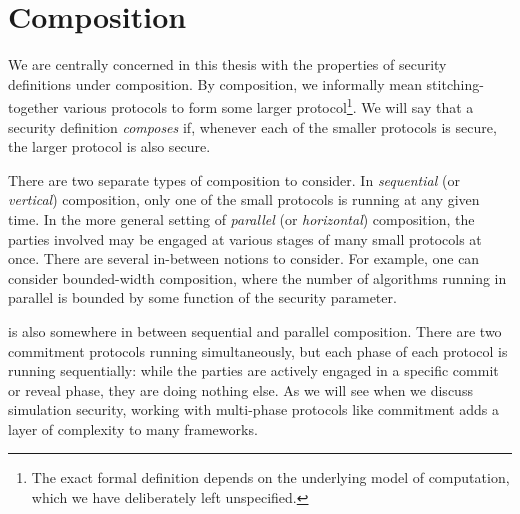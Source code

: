 

\section{Composition}

We are centrally concerned in this thesis with the properties of security
definitions under composition. By composition, we informally mean
stitching-together various protocols to form some larger protocol\footnote{The
	exact formal definition depends on the underlying model of computation, which
	we have deliberately left unspecified.}. We will say that a security
definition \emph{composes} if, whenever each of the smaller protocols is
secure, the larger protocol is also secure.

There are two separate types of composition to consider. In \emph{sequential}
(or \emph{vertical}) composition, only one of the small protocols is running at
any given time. In the more general setting of \emph{parallel} (or
\emph{horizontal}) composition, the parties involved may be engaged at various
stages of many small protocols at once. There are several in-between notions to
consider. For example, one can consider bounded-width composition, where the
number of algorithms running in parallel is bounded by some function of the
security parameter.

 is also somewhere in between sequential and
parallel composition. There are two commitment protocols running simultaneously,
but each phase of each protocol is running sequentially: while the parties are
actively engaged in a specific commit or reveal phase, they are doing nothing
else. As we will see when we discuss simulation security, working with
multi-phase protocols like commitment adds a layer of complexity to many
frameworks.

